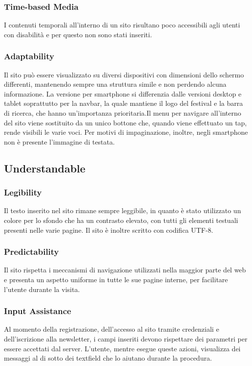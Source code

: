 \documentclass[10pt, a4paper]{article}
\begin{document}
\subsubsection{Time-based Media}
I contenuti temporali all'interno di un sito risultano poco accessibili agli utenti con disabilità e per questo non sono stati inseriti.

\subsubsection{Adaptability}
Il sito può essere visualizzato su diversi dispositivi con dimensioni dello schermo differenti, mantenendo sempre una struttura simile e non perdendo alcuna informazione. La versione per smartphone si differenzia dalle versioni desktop e tablet soprattutto per la navbar, la quale mantiene il logo del festival e la barra di ricerca, che hanno un'importanza prioritaria.Il menu per navigare all'interno del sito viene sostituito da un unico bottone che, quando viene effettuato un tap, rende visibili le varie voci. Per motivi di impaginazione, inoltre, negli smartphone non è presente l’immagine di testata.

\subsection{Understandable}

\subsubsection{Legibility}
Il testo inserito nel sito rimane sempre leggibile, in quanto è stato utilizzato un colore per lo sfondo che ha un contrasto elevato, con tutti gli elementi testuali presenti nelle varie pagine. Il sito è inoltre scritto con codifica UTF-8.


\subsubsection{Predictability}
Il sito rispetta i meccanismi di navigazione utilizzati nella maggior parte del web e presenta un aspetto uniforme in tutte le sue pagine interne, per facilitare l'utente durante la visita.


\subsubsection{Input Assistance}
Al momento della registrazione, dell’accesso al sito tramite credenziali e dell'iscrizione alla newsletter, i campi inseriti devono rispettare dei parametri per essere accettati dal server. L’utente, mentre esegue queste azioni, visualizza dei messaggi al di sotto dei textfield che lo aiutano durante la procedura.
\end{document}
